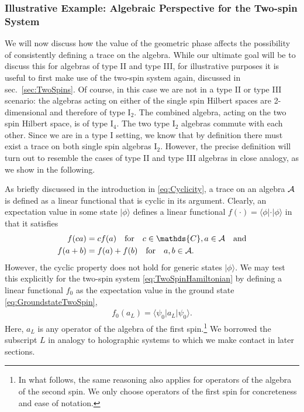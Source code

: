 \documentclass[a4paper,11pt]{article}
\newcommand{\1}{\mathds{1}}
\begin{document}
\subsubsection{Illustrative Example: Algebraic Perspective for the Two-spin System}
\label{sec:IllustrativeExampleTwoSpin}

We will now discuss how the value of the geometric phase affects the possibility of consistently defining a trace on the algebra. While our ultimate goal will be to discuss this for algebras of type II and type III, for illustrative purposes it is useful to first make use of the two-spin system again, discussed in sec.~\ref{sec:TwoSpins}. Of course, in this case we are not in a type II or type III scenario: the algebras acting on either of the single spin Hilbert spaces are 2-dimensional and therefore of type I$_2$. The combined algebra, acting on the two spin Hilbert space, is of type I$_4$. The two type I$_2$ algebras commute with each other. Since we are in a type I setting, we know that by definition there must exist a trace on both single spin algebras I$_2$. However, the precise definition will turn out to resemble the cases of type II and type III algebras in close analogy, as we show in the following.

As briefly discussed in the introduction in \eqref{eq:Cyclicity}, a trace on an algebra ${\cal A}$ is defined as a linear functional that is cyclic in its argument. Clearly, an expectation value in some state $|\phi\rangle$ defines a linear functional $f(\cdot)=\langle\phi|\cdot|\phi\rangle$ in that it satisfies
\begin{align}
    f(ca)&=cf(a)\quad\text{for}\quad c\in\mathds{C},a\in{\cal A}\quad\text{and}\\
    f(a+b)&=f(a)+f(b)\quad\text{for}\quad a,b\in{\cal A}.
\end{align}
However, the cyclic property does not hold for generic states $|\phi\rangle$. We may test this explicitly for the two-spin system \eqref{eq:TwoSpinHamiltonian} by defining a linear functional $f_0$ as the expectation value in the ground state \eqref{eq:GroundstateTwoSpin},
\begin{align}
    f_0(a_L)=\langle\psi_0|a_L|\psi_0\rangle.\label{eq:LinFuncTwoSpin}
\end{align}
Here, $a_L$ is any operator of the algebra of the first spin.\footnote{In what follows, the same reasoning also applies for operators of the algebra of the second spin. We only choose operators of the first spin for concreteness and ease of notation.} We borrowed the subscript $L$ in analogy to holographic systems to which we make contact in later sections.
\end{document}

